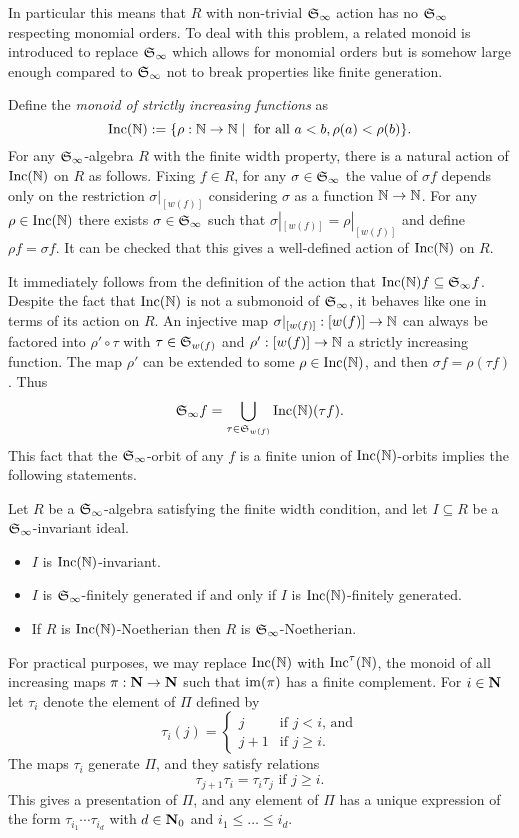 In particular this means that $R$ with non-trivial $\mathfrak S_\infty$ action has no $\mathfrak S_\infty$ respecting monomial orders.  To deal with this problem, a related monoid is introduced to replace $\mathfrak S_\infty$ which allows for monomial orders but is somehow large enough compared to $\mathfrak S_\infty$ not to break properties like finite generation.

Define the {\em monoid of strictly increasing functions} as
\[ \operatorname{Inc}(\mathbb N) := \{ \rho:\mathbb N \to \mathbb N \mid \text{ for all } a < b, \rho(a) < \rho(b) \}. \]
For any $\mathfrak S_\infty$-algebra $R$ with the finite width property, there is a natural action of $\operatorname{Inc}(\mathbb N)$ on $R$ as follows.  Fixing $f \in R$, for any $\sigma \in \mathfrak S_\infty$ the value of $\sigma f$ depends only on the restriction $\sigma|_{[w(f)]}$ considering $\sigma$ as a function $\mathbb N \to \mathbb N$.  For any $\rho \in \operatorname{Inc}(\mathbb N)$ there exists $\sigma \in \mathfrak S_\infty$ such that $\sigma|_{[w(f)]} = \rho|_{[w(f)]}$ and define $\rho f = \sigma f$.  It can be checked that this gives a well-defined action of $\operatorname{Inc}(\mathbb N)$ on $R$.

It immediately follows from the definition of the action that $\operatorname{Inc}(\mathbb N) f \subseteq \mathfrak S_\infty f$.  Despite the fact that $\operatorname{Inc}(\mathbb N)$ is not a submonoid of $\mathfrak S_\infty$, it behaves like one in terms of its action on $R$.  An injective map $\sigma|_{[w(f)]}: [w(f)] \to \mathbb N$ can always be factored into $\rho' \circ \tau$ with $\tau \in \mathfrak S_{w(f)}$ and $\rho':[w(f)] \to \mathbb N$ a strictly increasing function.  The map $\rho'$ can be extended to some $\rho \in \operatorname{Inc}(\mathbb N)$, and then $\sigma f = \rho (\tau f)$.  Thus
 \[ \mathfrak S_\infty f = \bigcup_{\tau \in \mathfrak S_{w(f)}} \operatorname{Inc}(\mathbb N)(\tau f). \]
This fact that the $\mathfrak S_\infty$-orbit of any $f$ is a finite union of $\operatorname{Inc}(\mathbb N)$-orbits implies the following statements.

\begin{proposition}
 Let $R$ be a $\mathfrak S_\infty$-algebra satisfying the finite width condition, and let $I\subseteq R$ be a $\mathfrak S_\infty$-invariant ideal.
 \begin{itemize}
  \item $I$ is $\operatorname{Inc}(\mathbb N)$-invariant.
  \item $I$ is $\mathfrak S_\infty$-finitely generated if and only if $I$ is $\operatorname{Inc}(\mathbb N)$-finitely generated.
  \item If $R$ is $\operatorname{Inc}(\mathbb N)$-Noetherian then $R$ is $\mathfrak S_\infty$-Noetherian.
 \end{itemize}
\end{proposition}

\begin{remark}\label{rem:IncT}
For practical purposes, we may replace $\operatorname{Inc}(\mathbb N)$ with $\operatorname{Inc}^\tau(\mathbb N)$, the monoid of all increasing maps
$\pi:\mathbf N \to \mathbf N$ such that $\operatorname{im}(\pi)$ has a finite complement. 
For $i \in \mathbf N$ let $\tau_i$ denote the element of $\Pi$ defined by
\[ \tau_i(j)=
\begin{cases} 
	j & \text{if $j<i$, and}\\
	j+1 & \text{if $j \geq i$.}
\end{cases}
\]
The maps $\tau_i$ generate $\Pi$, and they satisfy relations
\[ \tau_{j+1}\tau_i=\tau_i \tau_j \text{ if }j \geq i. \]
This gives a presentation of $\Pi$, and any element of $\Pi$
has a unique expression of the form $\tau_{i_1} \cdots \tau_{i_d}$
with $d \in \mathbf N_0$ and $i_1 \leq \ldots \leq i_d$.
\end{remark}

